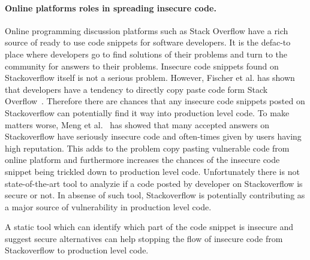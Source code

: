    \paragraph{Online platforms roles in spreading insecure code.} Online programming discussion platforms such as Stack Overflow have a rich source of ready to use code snippets for software developers. It is the defac-to place where developers go to find solutions of their problems and turn to the community for answers to their problems. 
   Insecure code snippets found on Stackoverflow itself is not a serious problem. However,  
   Fischer et al. has shown that developers have a tendency to directly copy paste code form Stack Overflow~\cite{fischer2017stack}. Therefore there are chances that any insecure code snippets posted on Stackoverflow can potentially find it way into production level code. To make matters worse, Meng et al.~\cite{meng2018secure} has showed that many accepted answers on Stackoverflow have seriously insecure code and often-times given by users having high reputation. This adds to the problem copy pasting vulnerable code from online platform and furthermore increases the chances of the insecure code snippet being trickled down to production level code. 
   Unfortunately there is not state-of-the-art tool to analyzie if a code posted by developer on Stackoverflow is secure or not. In absense of such tool, Stackoverflow is potentially contributing as a major source of vulnerability in production level code.  
   
   A static tool which can identify which part of the code snippet is insecure and suggest secure alternatives can help stopping the flow of insecure code from Stackoverflow to production level code.   